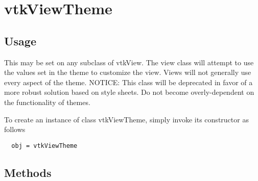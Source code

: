 \section{vtkViewTheme}

\subsection{Usage}

 This may be set on any subclass of vtkView.  The view class will attempt
 to use the values set in the theme to customize the view.  Views will not
 generally use every aspect of the theme.
 NOTICE: This class will be deprecated in favor of a more robust
 solution based on style sheets.  Do not become overly-dependent on the
 functionality of themes.

To create an instance of class vtkViewTheme, simply
invoke its constructor as follows
\begin{verbatim}
  obj = vtkViewTheme
\end{verbatim}
\subsection{Methods}

